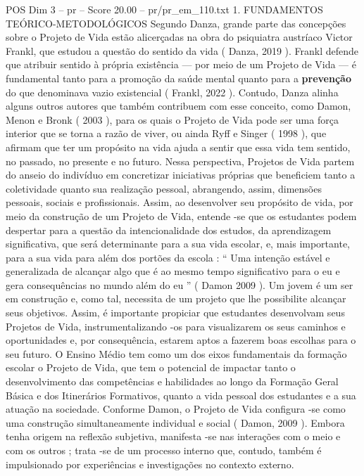 \begin{textsample}{POS Dim 3 – pr – Score 20.00 – pr/pr\_em\_110.txt}  \label{ex:f3_pos_156}
1.
FUNDAMENTOS TEÓRICO-METODOLÓGICOS Segundo Danza, grande parte das concepções sobre o Projeto de Vida estão alicerçadas na obra do psiquiatra austríaco Victor Frankl, que estudou a questão do sentido da vida ( Danza, 2019 ).
Frankl defende que atribuir sentido à própria existência — por meio de um Projeto de Vida — é fundamental tanto para a promoção da saúde mental quanto para a \textbf{prevenção} do que denominava vazio existencial ( Frankl, 2022 ).
Contudo, Danza alinha alguns outros autores que também contribuem com esse conceito, como Damon, Menon e Bronk ( 2003 ), para os quais o Projeto de Vida pode ser uma força interior que se torna a razão de viver, ou ainda Ryff e Singer ( 1998 ), que afirmam que ter um propósito na vida ajuda a sentir que essa vida tem sentido, no passado, no presente e no futuro.
Nessa perspectiva, Projetos de Vida partem do anseio do indivíduo em concretizar iniciativas próprias que beneficiem tanto a coletividade quanto sua realização pessoal, abrangendo, assim, dimensões pessoais, sociais e profissionais.
Assim, ao desenvolver seu propósito de vida, por meio da construção de um Projeto de Vida, entende -se que os estudantes podem despertar para a questão da intencionalidade dos estudos, da aprendizagem significativa, que será determinante para a sua vida escolar, e, mais importante, para a sua vida para além dos portões da escola : “ Uma intenção estável e generalizada de alcançar algo que é ao mesmo tempo significativo para o eu e gera consequências no mundo além do eu ” ( Damon 2009 ).
Um jovem é um ser em construção e, como tal, necessita de um projeto que lhe possibilite alcançar seus objetivos.
Assim, é importante propiciar que estudantes desenvolvam seus Projetos de Vida, instrumentalizando -os para visualizarem os seus caminhos e oportunidades e, por consequência, estarem aptos a fazerem boas escolhas para o seu futuro.
O Ensino Médio tem como um dos eixos fundamentais da formação escolar o Projeto de Vida, que tem o potencial de impactar tanto o desenvolvimento das competências e habilidades ao longo da Formação Geral Básica e dos Itinerários Formativos, quanto a vida pessoal dos estudantes e a sua atuação na sociedade.
Conforme Damon, o Projeto de Vida configura -se como uma construção simultaneamente individual e social ( Damon, 2009 ).
Embora tenha origem na reflexão subjetiva, manifesta -se nas interações com o meio e com os outros ; trata -se de um processo interno que, contudo, também é impulsionado por experiências e investigações no contexto externo.

\end{textsample}
